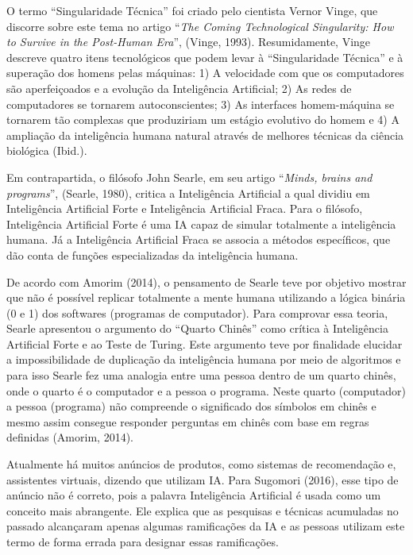 O termo ``Singularidade Técnica'' foi criado pelo cientista Vernor
Vinge, que discorre sobre este tema no artigo ``\emph{The Coming
Technological Singularity: How to Survive in the Post-Human Era}'',
(Vinge, 1993). Resumidamente, Vinge descreve quatro itens tecnológicos
que podem levar à ``Singularidade Técnica'' e à superação dos homens
pelas máquinas: 1) A velocidade com que os computadores são
aperfeiçoados e a evolução da Inteligência Artificial; 2) As redes de
computadores se tornarem autoconscientes; 3) As interfaces homem-máquina
se tornarem tão complexas que produziriam um estágio evolutivo do homem
e 4) A ampliação da inteligência humana natural através de melhores
técnicas da ciência biológica (Ibid.).

Em contrapartida, o filósofo John Searle, em seu artigo ``\emph{Minds,
brains and programs}'', (Searle, 1980), critica a Inteligência
Artificial a qual dividiu em Inteligência Artificial Forte e
Inteligência Artificial Fraca. Para o filósofo, Inteligência Artificial
Forte é uma IA capaz de simular totalmente a inteligência humana. Já a
Inteligência Artificial Fraca se associa a métodos específicos, que dão
conta de funções especializadas da inteligência humana.

De acordo com Amorim (2014), o pensamento de Searle teve por objetivo
mostrar que não é possível replicar totalmente a mente humana utilizando
a lógica binária (0 e 1) dos softwares (programas de computador). Para
comprovar essa teoria, Searle apresentou o argumento do ``Quarto
Chinês'' como crítica à Inteligência Artificial Forte e ao Teste de
Turing. Este argumento teve por finalidade elucidar a impossibilidade de
duplicação da inteligência humana por meio de algoritmos e para isso
Searle fez uma analogia entre uma pessoa dentro de um quarto chinês,
onde o quarto é o computador e a pessoa o programa. Neste quarto
(computador) a pessoa (programa) não compreende o significado dos
símbolos em chinês e mesmo assim consegue responder perguntas em chinês
com base em regras definidas (Amorim, 2014).

Atualmente há muitos anúncios de produtos, como sistemas de recomendação
e, assistentes virtuais, dizendo que utilizam IA. Para Sugomori (2016),
esse tipo de anúncio não é correto, pois a palavra Inteligência
Artificial é usada como um conceito mais abrangente. Ele explica que as
pesquisas e técnicas acumuladas no passado alcançaram apenas algumas
ramificações da IA e as pessoas utilizam este termo de forma errada para
designar essas ramificações.

